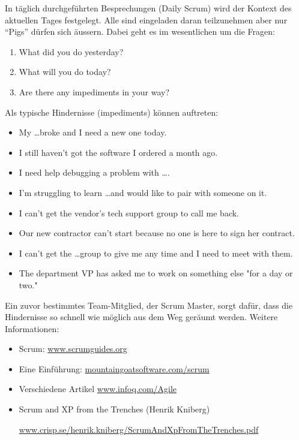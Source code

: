 \begin{minipage}[t]{0.5\linewidth}
In täglich durchgeführten Besprechungen (Daily Scrum) wird der
Kontext des aktuellen Tages festgelegt. Alle sind eingeladen daran
teilzunehmen aber nur ``Pigs'' dürfen sich äussern. Dabei geht
es im wesentlichen um die Fragen:
\begin{enumerate}
\item What did you do yesterday?
\item What will you do today?
\item Are there any impediments in your way?
\end{enumerate}
\newslide
Als typische Hindernisse (impediments) können auftreten:
\begin{itemize}
\item My \ldots broke and I need a new one today.
\item I still haven't got the software I ordered a month ago.
\item I need help debugging a problem with \ldots.
\item I'm struggling to learn \ldots and would like to pair with someone on it.
\item I can't get the vendor's tech support group to call me back.
\item Our new contractor can't start because no one is here to sign her contract.
\item I can't get the \ldots group to give me any time and I need to meet with them.
\item The department VP has asked me to work on something else "for a day or two."
\end{itemize}
Ein zuvor bestimmtes Team-Mitglied, der Scrum Master, sorgt dafür, dass
die Hindernisse so schnell wie möglich aus dem Weg geräumt werden.
%
\newslide
Weitere Informationen:
\begin{itemize}
\item Scrum: \href{https://www.scrumguides.org/scrum-guide.html}{www.scrumguides.org}
\item Eine Einführung: \href{https://mountaingoatsoftware.com/scrum}
    {mountaingoatsoftware.com/scrum}
\item Verschiedene Artikel
  \href{https://www.infoq.com/Agile}{www.infoq.com/Agile}
\item Scrum and XP from the Trenches (Henrik Kniberg)

  \href{https://www.infoq.com/minibooks/scrum-xp-from-the-trenches}
   {www.crisp.se/henrik.kniberg/ScrumAndXpFromTheTrenches.pdf}
%
\end{itemize}
%
\newpage

\end{minipage}
